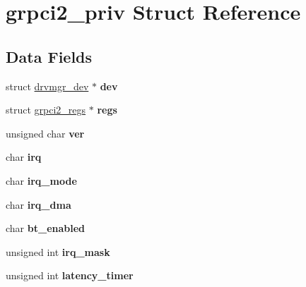 \hypertarget{structgrpci2__priv}{}\section{grpci2\+\_\+priv Struct Reference}
\label{structgrpci2__priv}
\subsection*{Data Fields}
\begin{DoxyCompactItemize}
\item 
\mbox{\label{structgrpci2__priv_a800d64afc38d987a23c67e4ec30d95c8}} 
struct \mbox{\hyperlink{structdrvmgr__dev}{drvmgr\+\_\+dev}} $\ast$ {\bfseries dev}
\item 
\mbox{\label{structgrpci2__priv_a2af616f2a9fb488419d69c94cb005e63}} 
struct \mbox{\hyperlink{structgrpci2__regs}{grpci2\+\_\+regs}} $\ast$ {\bfseries regs}
\item 
\mbox{\label{structgrpci2__priv_a11863de1002e9a15a7b57615b1b5c60b}} 
unsigned char {\bfseries ver}
\item 
\mbox{\label{structgrpci2__priv_a8668e9211d1b2e2a62f322ec421d961f}} 
char {\bfseries irq}
\item 
\mbox{\label{structgrpci2__priv_a5129d13e5fefdc10acfbe7b2b0a98da2}} 
char {\bfseries irq\+\_\+mode}
\item 
\mbox{\label{structgrpci2__priv_a4d2641c609ae71b7e22fc48c38e26a92}} 
char {\bfseries irq\+\_\+dma}
\item 
\mbox{\label{structgrpci2__priv_ac425c5ac8d136c6aefdd045bf12a95aa}} 
char {\bfseries bt\+\_\+enabled}
\item 
\mbox{\label{structgrpci2__priv_ae2d42dc229f23cc0bca1b6a26cd53593}} 
unsigned int {\bfseries irq\+\_\+mask}
\item 
\mbox{\label{structgrpci2__priv_ae177dfb0ab95a83ebfd5c8614b4b88df}} 
unsigned int {\bfseries latency\+\_\+timer}
\item 

\end{DoxyCompactItemize}

